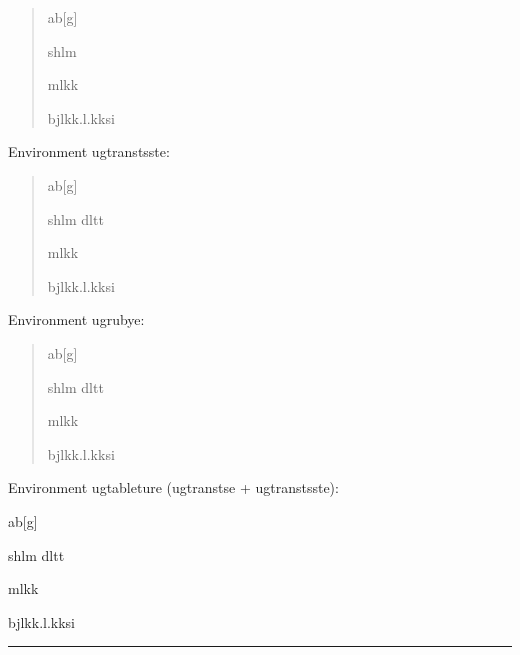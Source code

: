 \begin{quotation}
\begin{ugtranstse}
ab[g] 

shlm 

ml\tlcorner kk\trcorner

\lbracket b\rbracket jlkk.l.kks\tlcorner i\trcorner
\end{ugtranstse}
\end{quotation}


Environment ugtranstsste:

\begin{quotation}
\begin{ugtranstsste}
ab[g] 

shlm dltt

ml\tlcorner kk\trcorner

\lbracket b\rbracket jlkk.l.kks\tlcorner i\trcorner
\end{ugtranstsste}
\end{quotation}

Environment ugrubye:

\begin{quotation}
\begin{ugrubye}
ab[g] 

shlm dltt

ml\tlcorner kk\trcorner

\lbracket b\rbracket jlkk.l.kks\tlcorner i\trcorner
\end{ugrubye}
\end{quotation}


Environment ugtableture (ugtranstse + ugtranstsste):

\begin{ugtableture}
ab[g] 

shlm dltt

ml\tlcorner kk\trcorner

\lbracket b\rbracket jlkk.l.kks\tlcorner i\trcorner
\end{ugtableture}


\bigskip
\hrule


